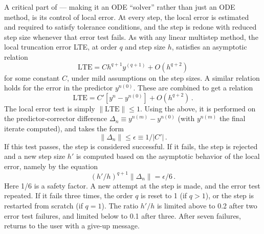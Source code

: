 A critical part of {\cvodes} --- making it an ODE ``solver'' rather than
just an ODE method, is its control of local error.  At every step, the
local error is estimated and required to satisfy tolerance conditions,
and the step is redone with reduced step size whenever that error test
fails.  As with any linear multistep method, the local truncation
error LTE, at order $q$ and step size $h$, satisfies an asymptotic
relation
\[ \mbox{LTE} = C h^{q+1} y^{(q+1)} + O(h^{q+2}) \]
for some constant $C$, under mild assumptions on the step sizes.
A similar relation holds for the error in the predictor $y^{n(0)}$.
These are combined to get a relation
\[ \mbox{LTE} = C' [y^n - y^{n(0)}] + O(h^{q+2}) \, . \]
The local error test is simply $\|\mbox{LTE}\| \leq 1$.  Using the above,
it is performed on the predictor-corrector difference
$\Delta_n \equiv y^{n(m)} - y^{n(0)}$ (with $y^{n(m)}$ the final
iterate computed), and takes the form
\[ \|\Delta_n\| \leq \epsilon \equiv 1/|C'| \, . \]
If this test passes, the step is considered successful.  If it fails,
the step is rejected and a new step size $h'$ is computed based on the
asymptotic behavior of the local error, namely by the equation
\[ (h'/h)^{q+1} \|\Delta_n\| = \epsilon/6 \, . \]
Here 1/6 is a safety factor.  A new attempt at the step is made,
and the error test repeated.  If it fails three times, the order $q$
is reset to 1 (if $q > 1$), or the step is restarted from scratch (if
$q = 1$).  The ratio $h'/h$ is limited above to 0.2 after two error test
failures, and limited below to 0.1 after three.  After seven failures,
{\cvodes} returns to the user with a give-up message.

